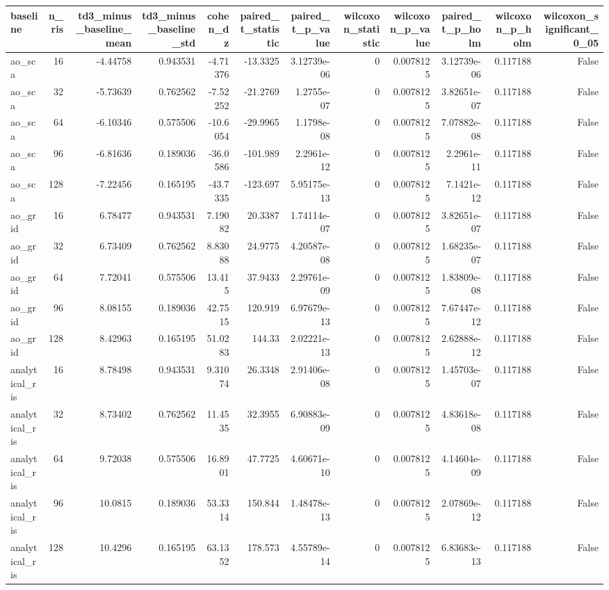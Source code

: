 \begin{tabular}{lrrrrrrrrrrr}
\toprule
baseline & n_ris & td3_minus_baseline_mean & td3_minus_baseline_std & cohen_dz & paired_t_statistic & paired_t_p_value & wilcoxon_statistic & wilcoxon_p_value & paired_t_p_holm & wilcoxon_p_holm & wilcoxon_significant_0_05 \\
\midrule
ao_sca & 16 & -4.44758 & 0.943531 & -4.71376 & -13.3325 & 3.12739e-06 & 0 & 0.0078125 & 3.12739e-06 & 0.117188 & False \\
ao_sca & 32 & -5.73639 & 0.762562 & -7.52252 & -21.2769 & 1.2755e-07 & 0 & 0.0078125 & 3.82651e-07 & 0.117188 & False \\
ao_sca & 64 & -6.10346 & 0.575506 & -10.6054 & -29.9965 & 1.1798e-08 & 0 & 0.0078125 & 7.07882e-08 & 0.117188 & False \\
ao_sca & 96 & -6.81636 & 0.189036 & -36.0586 & -101.989 & 2.2961e-12 & 0 & 0.0078125 & 2.2961e-11 & 0.117188 & False \\
ao_sca & 128 & -7.22456 & 0.165195 & -43.7335 & -123.697 & 5.95175e-13 & 0 & 0.0078125 & 7.1421e-12 & 0.117188 & False \\
ao_grid & 16 & 6.78477 & 0.943531 & 7.19082 & 20.3387 & 1.74114e-07 & 0 & 0.0078125 & 3.82651e-07 & 0.117188 & False \\
ao_grid & 32 & 6.73409 & 0.762562 & 8.83088 & 24.9775 & 4.20587e-08 & 0 & 0.0078125 & 1.68235e-07 & 0.117188 & False \\
ao_grid & 64 & 7.72041 & 0.575506 & 13.415 & 37.9433 & 2.29761e-09 & 0 & 0.0078125 & 1.83809e-08 & 0.117188 & False \\
ao_grid & 96 & 8.08155 & 0.189036 & 42.7515 & 120.919 & 6.97679e-13 & 0 & 0.0078125 & 7.67447e-12 & 0.117188 & False \\
ao_grid & 128 & 8.42963 & 0.165195 & 51.0283 & 144.33 & 2.02221e-13 & 0 & 0.0078125 & 2.62888e-12 & 0.117188 & False \\
analytical_ris & 16 & 8.78498 & 0.943531 & 9.31074 & 26.3348 & 2.91406e-08 & 0 & 0.0078125 & 1.45703e-07 & 0.117188 & False \\
analytical_ris & 32 & 8.73402 & 0.762562 & 11.4535 & 32.3955 & 6.90883e-09 & 0 & 0.0078125 & 4.83618e-08 & 0.117188 & False \\
analytical_ris & 64 & 9.72038 & 0.575506 & 16.8901 & 47.7725 & 4.60671e-10 & 0 & 0.0078125 & 4.14604e-09 & 0.117188 & False \\
analytical_ris & 96 & 10.0815 & 0.189036 & 53.3314 & 150.844 & 1.48478e-13 & 0 & 0.0078125 & 2.07869e-12 & 0.117188 & False \\
analytical_ris & 128 & 10.4296 & 0.165195 & 63.1352 & 178.573 & 4.55789e-14 & 0 & 0.0078125 & 6.83683e-13 & 0.117188 & False \\
\bottomrule
\end{tabular}
